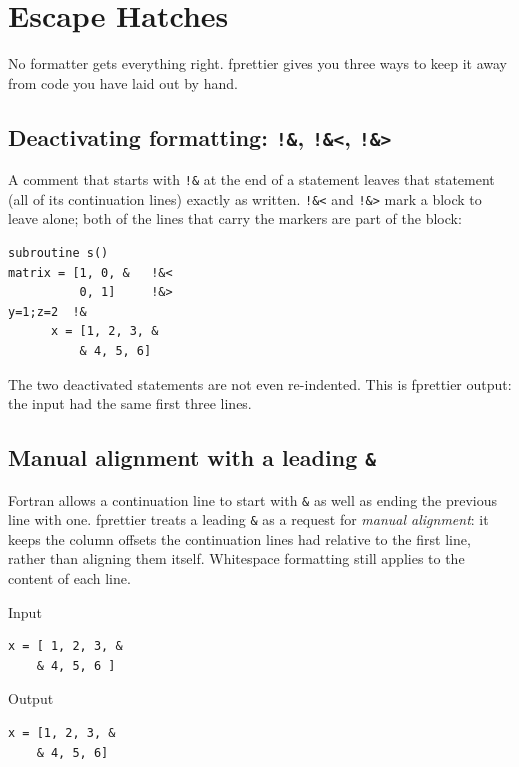 \documentclass[11pt,a4paper,openany]{book}
\newcommand{\code}[1]{\texttt{\small #1}}
\newenvironment{beforecol}{\noindent\begin{minipage}[t]{0.485\linewidth}\textsf{\footnotesize\color{commentc}Input}}{\end{minipage}\hfill}
\newenvironment{aftercol}{\begin{minipage}[t]{0.485\linewidth}\textsf{\footnotesize\color{commentc}Output}}{\end{minipage}\par\medskip}
\begin{document}
\chapter{Escape Hatches}\label{ch:escape}

No formatter gets everything right. fprettier gives you three ways to keep it
away from code you have laid out by hand.

\section{Deactivating formatting: \texttt{!\&}, \texttt{!\&<}, \texttt{!\&>}}

A comment that starts with \code{!\&} at the end of a statement leaves that
statement (all of its continuation lines) exactly as written. \code{!\&<} and
\code{!\&>} mark a block to leave alone; both of the lines that carry the
markers are part of the block:

\begin{lstlisting}[style=after]
  subroutine s()
matrix = [1, 0, &   !&<
          0, 1]     !&>
y=1;z=2  !&
      x = [1, 2, 3, &
          & 4, 5, 6]
\end{lstlisting}

The two deactivated statements are not even re-indented. This is fprettier
output: the input had the same first three lines.

\section{Manual alignment with a leading \texttt{\&}}

Fortran allows a continuation line to start with \code{\&} as well as ending
the previous line with one. fprettier treats a leading \code{\&} as a request
for \emph{manual alignment}: it keeps the column offsets the continuation lines
had relative to the first line, rather than aligning them itself. Whitespace
formatting still applies to the content of each line.

\begin{beforecol}
\begin{lstlisting}[style=before]
x = [ 1, 2, 3, &
    & 4, 5, 6 ]
\end{lstlisting}
\end{beforecol}
\begin{aftercol}
\begin{lstlisting}[style=after]
x = [1, 2, 3, &
    & 4, 5, 6]
\end{lstlisting}
\end{aftercol}
\end{document}
